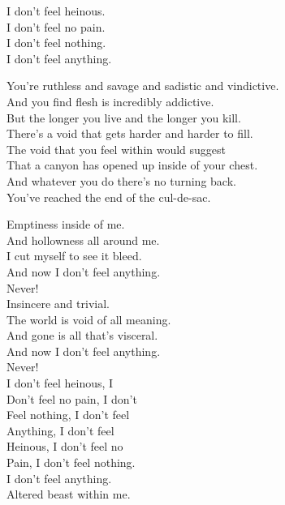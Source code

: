I don't feel heinous. \\
I don't feel no pain. \\
I don't feel nothing. \\
I don't feel anything. \\


You're ruthless and savage and sadistic and vindictive. \\
And you find  flesh is incredibly addictive. \\

But the longer you live and the longer you kill. \\
There's a void that gets harder and harder to fill. \\

The void that you feel within would suggest \\
That a canyon has opened up inside of your chest. \\

And whatever you do there's no turning back. \\
You've reached the end of the cul-de-sac. \\


Emptiness inside of me. \\
And hollowness all around me. \\
I cut myself to see it bleed. \\
And now I don't feel anything. \\
Never! \\

Insincere and trivial. \\
The world is void of all meaning. \\
And gone is all that's visceral. \\
And now I don't feel anything. \\
Never! \\

I don't feel heinous, I \\
Don't feel no pain, I don't \\
Feel nothing, I don't feel \\
Anything, I don't feel \\
Heinous, I don't feel no \\
Pain, I don't feel nothing. \\
I don't feel anything. \\
Altered beast within me. \\

